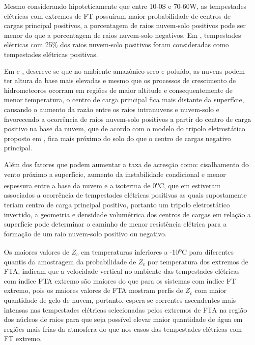 Mesmo considerando hipoteticamente que entre 10-0S e 70-60W, as tempestades elétricas com extremos de FT possuíram maior probabilidade de centros de cargas principal positivos, a porcentagem de raios nuvem-solo  positivos pode ser menor do que a porcentagem de raios nuvem-solo negativos. Em , tempestades elétricas com 25\% dos raios nuvem-solo positivos foram consideradas como tempestades elétricas positivas.

Em  e , descreve-se que no ambiente amazônico seco e poluído, as nuvens podem ter altura da base mais elevadas e mesmo que os processos de crescimento de hidrometeoros ocorram em regiões de maior altitude e consequentemente de menor temperatura, o centro de carga principal fica mais distante da superfície, causando  o aumento da razão entre os raios intranuvens e nuvem-solo e favorecendo a ocorrência de raios nuvem-solo positivos a partir do centro de carga positivo na base da nuvem, que de acordo com o modelo do tripolo eletrostático proposto em , fica mais próximo do solo do que o centro de cargas negativo principal.


Além  dos fatores que podem aumentar a taxa de acresção como: cisalhamento do vento próximo a superfície, aumento da instabilidade condicional e menor espessura entre a base da nuvem e a isoterma de 0\textsuperscript{o}C, que em  estiveram associados a ocorrência de tempestades elétricas positivas as quais supostamente teriam centro de carga principal positivo, portanto um tripolo eletrostático invertido, a geometria e densidade volumétrica dos centros de cargas em relação a superfície pode determinar o caminho de menor resistência elétrica para a formação de um raio nuvem-solo positivo ou negativo.

Os maiores valores de $Z_c$ em temperaturas inferiores a -10\textsuperscript{o}C para diferentes quantis da amostragem da probabilidade de $Z_c$ por temperatura dos extremos de FTA, indicam que a velocidade vertical no ambiente das tempestades elétricas com índice FTA extremo são maiores do que para os sistemas com índice FT extremo, pois os maiores valores de FTA mostram perfis de $Z_c$ com maior quantidade de gelo de nuvem, portanto, espera-se correntes ascendentes mais intensas nas tempestades elétricas selecionadas pelos extremos de FTA na região dos núcleos de raios para que seja possível elevar maior quantidade de água em regiões mais frias da atmosfera do que nos casos das tempestades elétricas com FT extremo. 

